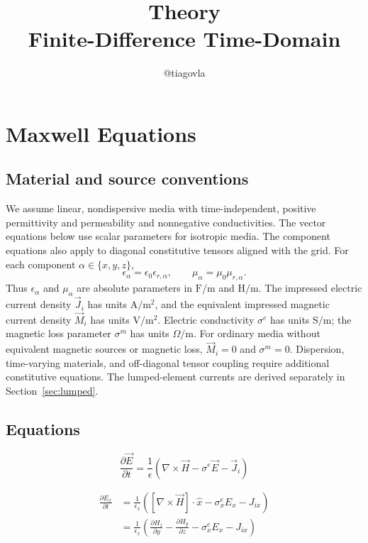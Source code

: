 \documentclass[10pt]{article}
\title{\textbf{Theory\\ Finite-Difference Time-Domain}}
\author{@tiagovla}
\date{}
\begin{document}
\maketitle
\section{Maxwell Equations}%
\subsection{Material and source conventions}
We assume linear, nondispersive media with time-independent, positive
permittivity and permeability and nonnegative conductivities. The vector
equations below use scalar parameters for isotropic media. The component
equations also apply to diagonal constitutive tensors aligned with the grid.
For each component $\alpha\in\{x,y,z\}$,
\begin{equation}
    \epsilon_\alpha=\epsilon_0\epsilon_{r,\alpha},
    \qquad \mu_\alpha=\mu_0\mu_{r,\alpha}.
\end{equation}
Thus $\epsilon_\alpha$ and $\mu_\alpha$ are absolute parameters in
$\mathrm{F/m}$ and $\mathrm{H/m}$. The impressed electric current density
$\vec{J}_i$ has units $\mathrm{A/m^2}$, and the equivalent impressed magnetic
current density $\vec{M}_i$ has units $\mathrm{V/m^2}$. Electric conductivity
$\sigma^e$ has units $\mathrm{S/m}$; the magnetic loss parameter $\sigma^m$
has units $\Omega/\mathrm{m}$. For ordinary media without equivalent magnetic
sources or magnetic loss, $\vec{M}_i=0$ and $\sigma^m=0$. Dispersion,
time-varying materials, and off-diagonal tensor coupling require additional
constitutive equations. The lumped-element currents are derived separately
in Section~\ref{sec:lumped}.

\subsection{Equations}%

\begin{equation}
	\frac{\partial \vec{E}}{\partial t} =
	\frac{1}{\epsilon} \left( \nabla \times \vec{H} - \sigma^{e} \vec{E} - \vec{J}_{i} \right)
\end{equation}

\begin{equation}
    \begin{aligned}
        \frac{\partial E_{x}}{\partial t} &= \frac{1}{\epsilon_{x}} \left( \left[ \nabla \times \vec{H} \right] \cdot \hat{x} - \sigma^{e}_{x} E_{x} - J_{ix} \right) \\
        & = \frac{1}{\epsilon_{x}} \left( \frac{\partial H_{z}}{\partial y} - \frac{\partial H_{y}}{\partial z} - \sigma^{e}_{x} E_{x} - J_{ix} \right)
    \end{aligned}
\end{equation}
\end{document}
